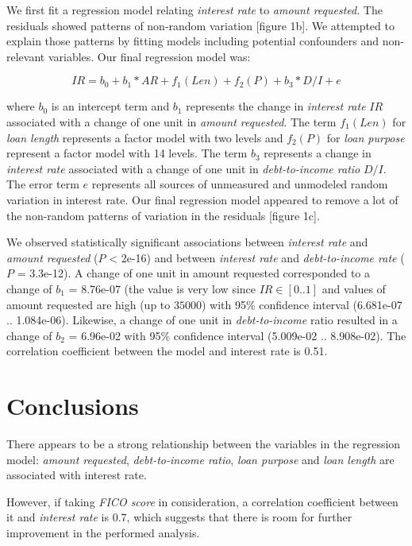 \documentclass[a4paper,12pt]{extarticle}
\begin{document}
We first fit a regression model relating \emph{interest rate} to \emph{amount requested}. The residuals showed patterns of non-random variation [figure 1b]. We attempted to explain those patterns by fitting models including potential confounders and non-relevant variables. Our final regression model was:

$$IR  = b_0 + b_1 * AR + f_1(Len) + f_2(P) + b_3 * D/I + e$$

where $b_0$ is an intercept term and $b_1$ represents the change in \emph{interest rate} $IR$ associated with a change of one unit in \emph{amount requested}. The term $f_1(Len)$ for \emph{loan length} represents a factor model with two levels and $f_2(P)$ for \emph{loan purpose} represent a factor model with 14 levels. The term $b_3$ represents a change in \emph{interest rate} associated with a change of one unit in \emph{debt-to-income ratio} $D/I$. The error term $e$ represents all sources of unmeasured and unmodeled random variation in interest rate. Our final regression model appeared to remove a lot of the non-random patterns of variation in the residuals [figure 1c].

We observed statistically significant associations between \emph{interest rate} and \emph{amount requested} ($P$ < 2e-16) and between \emph{interest rate} and \emph{debt-to-income rate} ($P$ = 3.3e-12). A change of one unit in amount requested corresponded to a change of $b_1$ = 8.76e-07 (the value is very low since $IR \in [0..1]$ and values of amount requested are high (up to $35 000$) with 95\% confidence interval (6.681e-07 .. 1.084e-06). Likewise, a change of one unit in \emph{debt-to-income} ratio resulted in a change of $b_2$ = 6.96e-02 with 95\% confidence interval (5.009e-02 .. 8.908e-02). The correlation coefficient between the model and interest rate is 0.51.


\section{Conclusions}

There appears to be a strong relationship between the variables in the regression model: \emph{amount requested}, \emph{debt-to-income ratio}, \emph{loan purpose} and \emph{loan length} are associated with interest rate.

However, if taking \emph{FICO score} in consideration, a correlation coefficient between it and \emph{interest rate} is 0.7, which suggests that there is room for further improvement in the performed analysis.
\end{document}
